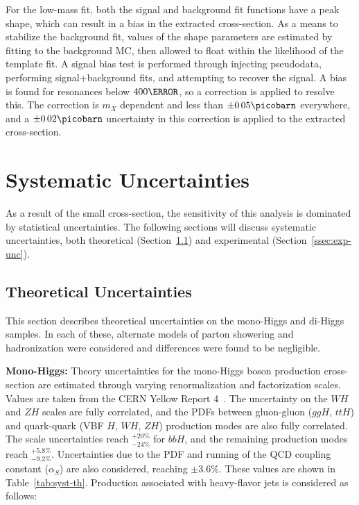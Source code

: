 For the low-mass fit, both the signal and background fit functions have a peak shape, which can result in a bias in the extracted cross-section. As a means to stabilize the background fit, values of the shape parameters are estimated by fitting to the background \gls{MC}, then allowed to float within the likelihood of the template fit. A signal bias test is performed through injecting pseudodata, performing signal+background fits, and attempting to recover the signal. A bias is found for resonances below $\unit{400}{\GeV}$, so a correction is applied to resolve this. The correction is $m_{X}$ dependent and less than $\pm\unit{0.05}{\picobarn}$ everywhere, and a $\pm\unit{0.02}{\picobarn}$ uncertainty in this correction is applied to the extracted cross-section.

\section{Systematic Uncertainties}

As a result of the small \hh cross-section, the sensitivity of this analysis is dominated by statistical uncertainties. The following sections will discuss systematic uncertainties, both theoretical (Section~\ref{ssec:theory-unc}) and experimental (Section~\ref{ssec:exp-unc}).

\subsection{Theoretical Uncertainties}\label{ssec:theory-unc}

This section describes theoretical uncertainties on the mono-Higgs and di-Higgs samples. In each of these, alternate models of parton showering and hadronization were considered and differences were found to be negligible.

\noindent\textbf{Mono-Higgs:} Theory uncertainties for the mono-Higgs boson production cross-section are estimated through varying renormalization and factorization scales. Values are taken from the CERN Yellow Report 4~\cite{yellow-report}. The uncertainty on the $WH$ and $ZH$ scales are fully correlated, and the PDFs between gluon-gluon ($ggH$, $ttH$) and quark-quark (VBF $H$, $WH$, $ZH$) production modes are also fully correlated. The scale uncertainties reach $^{+20\%}_{-24\%}$ for $bbH$, and the remaining production modes reach $^{+5.8\%}_{-9.2\%}$. Uncertainties due to the \gls{PDF} and running of the \gls{QCD} coupling constant ($\alpha_{S}$) are also considered, reaching $\pm3.6\%$. These values are shown in Table~\ref{tab:syst-th}. Production associated with heavy-flavor jets is considered as follows:

